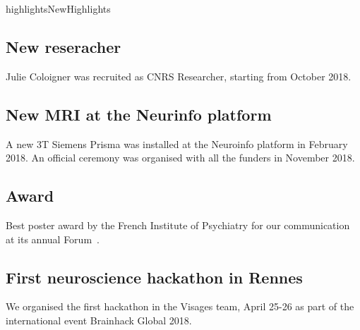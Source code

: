 \documentclass{ra2018}
\begin{document}

\begin{module}{highlights}{NewHighlights}{}

\subsection{New reseracher}
Julie Coloigner was recruited as CNRS Researcher, starting from October 2018.

\subsection{New MRI at the Neurinfo platform}
A new 3T Siemens Prisma was installed at the Neuroinfo platform in February 2018. An official ceremony was organised with all the funders in November 2018.

\subsection{Award}
Best poster award by the French Institute of Psychiatry for our communication at its annual Forum~.

\subsection{First neuroscience hackathon in Rennes}
We organised the first hackathon in the Visages team, April 25-26 as part of the international event Brainhack Global 2018.



\end{module}
\end{document}
